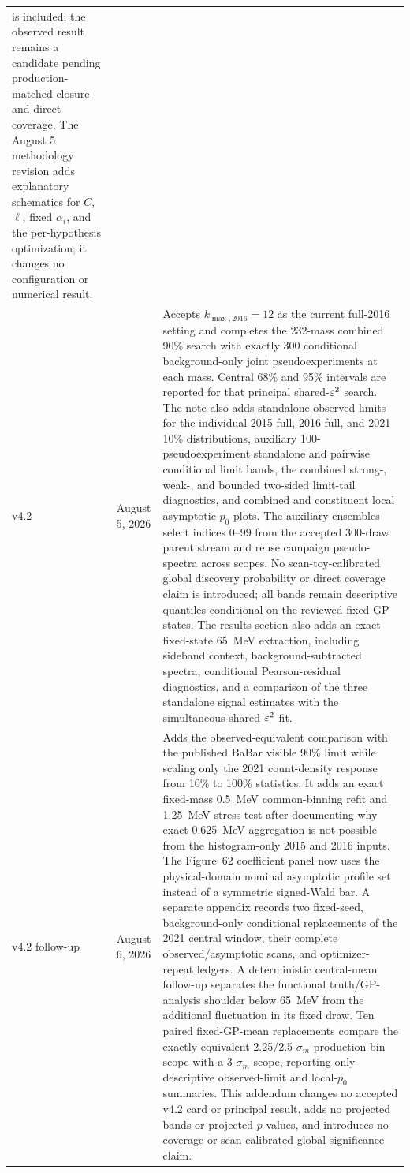 \begin{longtable}{P{0.11\textwidth}P{0.16\textwidth}P{0.64\textwidth}}
is included; the observed result remains a candidate pending production-matched
closure and direct coverage. The August 5 methodology revision adds explanatory
schematics for $C$, $\ell$, fixed $\alpha_i$, and the per-hypothesis optimization;
it changes no configuration or numerical result. \\
\addlinespace
v4.2 & August 5, 2026 &
Accepts $k_{\max,2016}=12$ as the current full-2016 setting and completes the
232-mass combined 90\% \CLs{} search with exactly 300 conditional background-only
joint pseudoexperiments at each mass. Central 68\% and 95\% intervals are
reported for that principal shared-$\varepsilon^2$ search. The note also adds
standalone observed limits for the individual 2015 full, 2016 full, and 2021
10\% distributions, auxiliary 100-pseudoexperiment standalone and pairwise
conditional limit bands, the combined strong-, weak-, and bounded two-sided
limit-tail diagnostics, and combined and constituent local asymptotic $p_0$
plots. The auxiliary ensembles select indices 0--99 from the accepted
300-draw parent stream and reuse campaign pseudo-spectra across scopes. No
scan-toy-calibrated global discovery probability or direct coverage claim is
introduced; all bands remain descriptive quantiles conditional on the reviewed
fixed GP states. The results section also
adds an exact fixed-state 65~MeV extraction, including sideband context,
background-subtracted spectra, conditional Pearson-residual diagnostics, and a
comparison of the three standalone signal estimates with the simultaneous
shared-$\varepsilon^2$ fit. \\
\addlinespace
v4.2 follow-up & August 6, 2026 &
Adds the observed-equivalent comparison with the published BaBar visible
90\% limit while scaling only the 2021 count-density response from 10\% to
100\% statistics.  It adds an exact fixed-mass 0.5~MeV common-binning refit
and 1.25~MeV stress test after documenting why exact 0.625~MeV aggregation is
not possible from the histogram-only 2015 and 2016 inputs.  The Figure~62
coefficient panel now uses the physical-domain nominal asymptotic profile set
instead of a symmetric signed-Wald bar.  A separate appendix records two
fixed-seed, background-only conditional replacements of the 2021 central
window, their complete observed/asymptotic scans, and optimizer-repeat
ledgers.  A deterministic central-mean follow-up separates the functional
truth/GP-analysis shoulder below 65~MeV from the additional fluctuation in its
fixed draw.  Ten paired fixed-GP-mean replacements compare the exactly
equivalent 2.25/2.5-$\sigma_m$ production-bin scope with a 3-$\sigma_m$
scope, reporting only descriptive observed-limit and local-$p_0$ summaries.
This addendum changes no accepted v4.2 card or principal result, adds no
projected bands or projected $p$-values, and introduces no coverage or
scan-calibrated global-significance claim. \\
\end{longtable}
\endgroup
